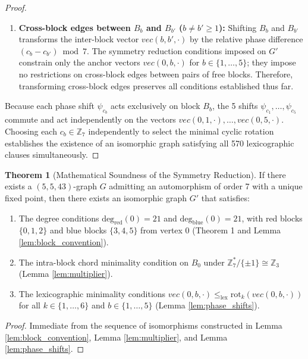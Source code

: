 \documentclass[11pt,a4paper]{article}
\theoremstyle{definition}
\newtheorem{theorem}{Theorem}
\begin{document}
\begin{proof}
\begin{enumerate}
    \item \textbf{Cross-block edges between $B_b$ and $B_{b'}$ ($b \ne b' \ge 1$):} Shifting $B_b$ and $B_{b'}$ transforms the inter-block vector $vec(b, b', \cdot)$ by the relative phase difference $(c_b - c_{b'}) \bmod 7$. The symmetry reduction conditions imposed on $G'$ constrain only the anchor vectors $vec(0, b, \cdot)$ for $b \in \{1,\dots,5\}$; they impose no restrictions on cross-block edges between pairs of free blocks. Therefore, transforming cross-block edges preserves all conditions established thus far.
\end{enumerate}
Because each phase shift $\psi_{c_b}$ acts exclusively on block $B_b$, the 5 shifts $\psi_{c_1}, \dots, \psi_{c_5}$ commute and act independently on the vectors $vec(0, 1, \cdot), \dots, vec(0, 5, \cdot)$. Choosing each $c_b \in \mathbb{Z}_7$ independently to select the minimal cyclic rotation establishes the existence of an isomorphic graph satisfying all 570 lexicographic clauses simultaneously.
\end{proof}

\begin{theorem}[Mathematical Soundness of the Symmetry Reduction]
\label{thm:soundness}
If there exists a $(5,5,43)$-graph $G$ admitting an automorphism of order 7 with a unique fixed point, then there exists an isomorphic graph $G'$ that satisfies:
\begin{enumerate}
    \item The degree conditions $\text{deg}_{\text{red}}(0) = 21$ and $\text{deg}_{\text{blue}}(0) = 21$, with red blocks $\{0,1,2\}$ and blue blocks $\{3,4,5\}$ from vertex 0 (Theorem 1 and Lemma \ref{lem:block_convention}).
    \item The intra-block chord minimality condition on $B_0$ under $\mathbb{Z}_7^* / \{\pm 1\} \cong \mathbb{Z}_3$ (Lemma \ref{lem:multiplier}).
    \item The lexicographic minimality conditions $vec(0, b, \cdot) \le_{\text{lex}} \text{rot}_k(vec(0, b, \cdot))$ for all $k \in \{1,\dots,6\}$ and $b \in \{1,\dots,5\}$ (Lemma \ref{lem:phase_shifts}).
\end{enumerate}
\end{theorem}
\begin{proof}
Immediate from the sequence of isomorphisms constructed in Lemma \ref{lem:block_convention}, Lemma \ref{lem:multiplier}, and Lemma \ref{lem:phase_shifts}.
\end{proof}
\end{document}
